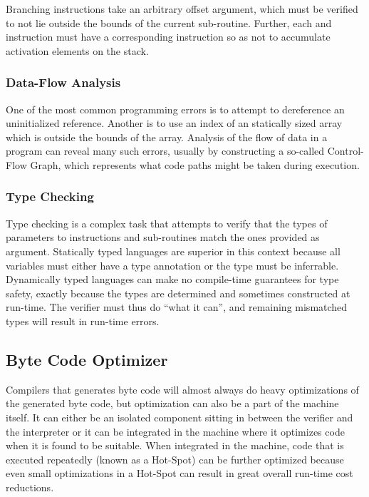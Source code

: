 Branching instructions take an arbitrary offset argument, which must be verified
to not lie outside the bounds of the current sub-routine. Further, each
 and  instruction must have a corresponding
 instruction so as not to accumulate activation elements on the
stack.

\subsubsection{Data-Flow Analysis}

One of the most common programming errors is to attempt to dereference an
uninitialized reference. Another is to use an index of an statically sized array
which is outside the bounds of the array. Analysis of the flow of data in a
program can reveal many such errors, usually by constructing a so-called
Control-Flow Graph, which represents what code paths might be taken during
execution.

\subsubsection{Type Checking}

Type checking is a complex task that attempts to verify that the types of
parameters to instructions and sub-routines match the ones provided as
argument. Statically typed languages are superior in this context because all
variables must either have a type annotation or the type must be
inferrable. Dynamically typed languages can make no compile-time guarantees for
type safety, exactly because the types are determined and sometimes constructed
at run-time. The verifier must thus do ``what it can'', and remaining mismatched
types will result in run-time errors.

\subsection{Byte Code Optimizer}

Compilers that generates byte code will almost always do heavy optimizations of
the generated byte code, but optimization can also be a part of the machine
itself. It can either be an isolated component sitting in between the verifier
and the interpreter or it can be integrated in the machine where it optimizes
code when it is found to be suitable. When integrated in the machine, code that
is executed repeatedly (known as a Hot-Spot) can be further optimized because
even small optimizations in a Hot-Spot can result in great overall run-time cost
reductions.

